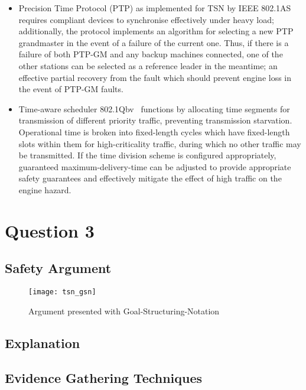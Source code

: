 \begin{itemize}
    \item Precision Time Protocol (PTP) as implemented for TSN by IEEE 802.1AS~\cite{IEEEStandardLocal2020} requires compliant devices to synchronise effectively under heavy load; additionally, the protocol implements an algorithm for selecting a new PTP grandmaster in the event of a failure of the current one.
    Thus, if there is a failure of both PTP-GM and any backup machines connected, one of the other stations can be selected as a reference leader in the meantime; an effective partial recovery from the fault which should prevent engine loss in the event of PTP-GM faults.
    \item Time-aware scheduler 802.1Qbv~\cite{IEEEStandardLocal2016a} functions by allocating time segments for transmission of different priority traffic, preventing transmission starvation.
    Operational time is broken into fixed-length cycles which have fixed-length slots within them for high-criticality traffic, during which no other traffic may be transmitted.
    If the time division scheme is configured appropriately, guaranteed maximum-delivery-time can be adjusted to provide appropriate safety guarantees and effectively mitigate the effect of high traffic on the engine hazard.
\end{itemize}

\section{Question 3}

\subsection{Safety Argument}

\begin{figure}[h]
\centering
\texttt{[image: tsn\_gsn]}
\caption{Argument presented with Goal-Structuring-Notation}
\end{figure}

\subsection{Explanation}

\subsection{Evidence Gathering Techniques}
